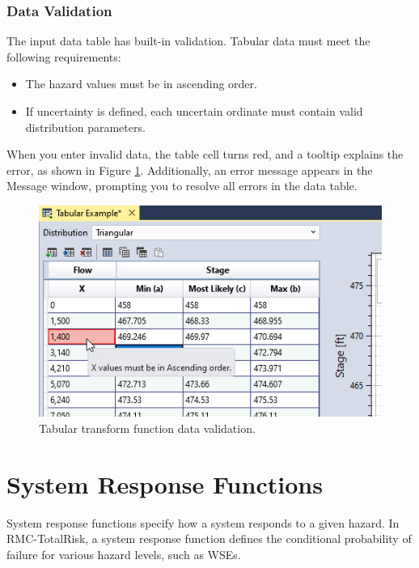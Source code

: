 \documentclass[
]{book}
\begin{document}
\hypertarget{data-validation-1}{%
\subsection{Data Validation}\label{data-validation-1}}

The input data table has built-in validation. Tabular data must meet the following requirements:

\begin{itemize}
\item
  The hazard values must be in ascending order.
\item
  If uncertainty is defined, each uncertain ordinate must contain valid distribution parameters.
\end{itemize}

When you enter invalid data, the table cell turns red, and a tooltip explains the error, as shown in Figure \ref{fig:figure-83}. Additionally, an error message appears in the Message window, prompting you to resolve all errors in the data table.

\begin{figure}

{\centering \includegraphics{images/figure83} 

}

\caption{Tabular transform function data validation.}\label{fig:figure-83}
\end{figure}

\hypertarget{system-response-functions}{%
\chapter{System Response Functions}\label{system-response-functions}}

System response functions specify how a system responds to a given hazard. In RMC-TotalRisk, a system response function defines the conditional probability of failure for various hazard levels, such as WSEs.
\end{document}
